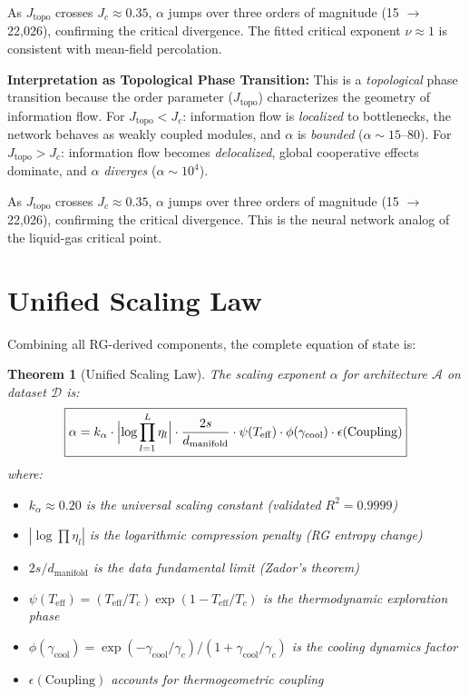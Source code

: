 \documentclass[11pt, a4paper]{article}
\newtheorem{theo}{Theorem}[section]
\theoremstyle{plain}
\begin{document}
As $J_{\mathrm{topo}}$ crosses $J_c \approx 0.35$, $\alpha$ jumps over three orders of magnitude (15 $\to$ 22,026), confirming the critical divergence. The fitted critical exponent $\nu \approx 1$ is consistent with mean-field percolation.

\medskip\noindent\textbf{Interpretation as Topological Phase Transition:} This is a \emph{topological} phase transition because the order parameter ($J_{\mathrm{topo}}$) characterizes the geometry of information flow. For $J_{\mathrm{topo}} < J_c$: information flow is \emph{localized} to bottlenecks, the network behaves as weakly coupled modules, and $\alpha$ is \emph{bounded} ($\alpha \sim 15$--$80$). For $J_{\mathrm{topo}} > J_c$: information flow becomes \emph{delocalized}, global cooperative effects dominate, and $\alpha$ \emph{diverges} ($\alpha \sim 10^4$).

As $J_{\mathrm{topo}}$ crosses $J_c \approx 0.35$, $\alpha$ jumps over three orders of magnitude (15 $\to$ 22,026), confirming the critical divergence. This is the neural network analog of the liquid-gas critical point.

\section{Unified Scaling Law}

Combining all RG-derived components, the complete equation of state is:

\begin{theo}[Unified Scaling Law]\label{theo:unified_scaling}
The scaling exponent $\alpha$ for architecture $\mathcal{A}$ on dataset $\mathcal{D}$ is:
\begin{equation}
\boxed{
\alpha = k_\alpha \cdot \Bigl|\log\prod_{l=1}^{L} \eta_l\Bigr| \cdot \frac{2s}{d_{\mathrm{manifold}}} \cdot \psi(T_{\mathrm{eff}}) \cdot \phi(\gamma_{\mathrm{cool}}) \cdot \epsilon(\mathrm{Coupling})
}
\end{equation}
where:
\begin{itemize}
\item $k_\alpha \approx 0.20$ is the universal scaling constant (validated $R^2 = 0.9999$)
\item $|\log\prod\eta_l|$ is the logarithmic compression penalty (RG entropy change)
\item $2s/d_{\mathrm{manifold}}$ is the data fundamental limit (Zador's theorem)
\item $\psi(T_{\mathrm{eff}}) = (T_{\mathrm{eff}}/T_c)\exp(1-T_{\mathrm{eff}}/T_c)$ is the thermodynamic exploration phase
\item $\phi(\gamma_{\mathrm{cool}}) = \exp(-\gamma_{\mathrm{cool}}/\gamma_c)/(1+\gamma_{\mathrm{cool}}/\gamma_c)$ is the cooling dynamics factor
\item $\epsilon(\mathrm{Coupling})$ accounts for thermogeometric coupling
\end{itemize}
\end{theo}
\end{document}
